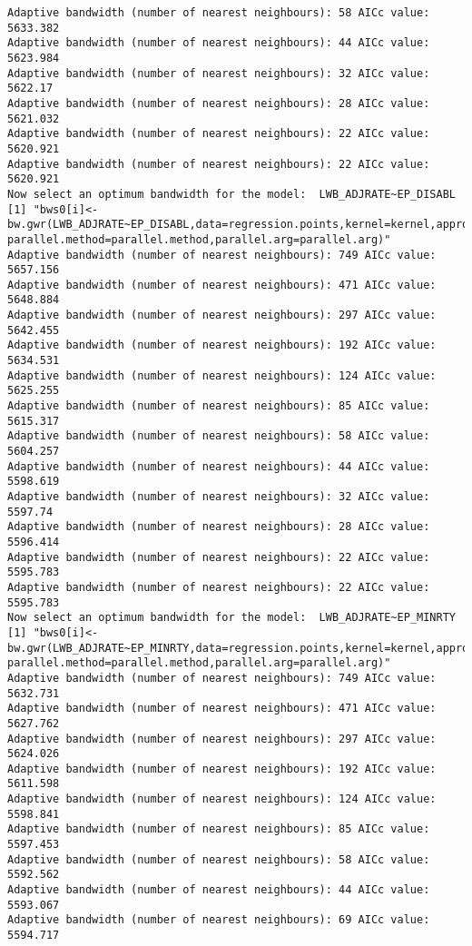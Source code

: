 \documentclass[
  12pt,
]{article}
\begin{document}
\begin{verbatim}
Adaptive bandwidth (number of nearest neighbours): 58 AICc value: 5633.382 
Adaptive bandwidth (number of nearest neighbours): 44 AICc value: 5623.984 
Adaptive bandwidth (number of nearest neighbours): 32 AICc value: 5622.17 
Adaptive bandwidth (number of nearest neighbours): 28 AICc value: 5621.032 
Adaptive bandwidth (number of nearest neighbours): 22 AICc value: 5620.921 
Adaptive bandwidth (number of nearest neighbours): 22 AICc value: 5620.921 
Now select an optimum bandwidth for the model:  LWB_ADJRATE~EP_DISABL 
[1] "bws0[i]<-bw.gwr(LWB_ADJRATE~EP_DISABL,data=regression.points,kernel=kernel,approach=approach,adaptive=adaptive,dMat=dMats[[var.dMat.indx[i]]], parallel.method=parallel.method,parallel.arg=parallel.arg)"
Adaptive bandwidth (number of nearest neighbours): 749 AICc value: 5657.156 
Adaptive bandwidth (number of nearest neighbours): 471 AICc value: 5648.884 
Adaptive bandwidth (number of nearest neighbours): 297 AICc value: 5642.455 
Adaptive bandwidth (number of nearest neighbours): 192 AICc value: 5634.531 
Adaptive bandwidth (number of nearest neighbours): 124 AICc value: 5625.255 
Adaptive bandwidth (number of nearest neighbours): 85 AICc value: 5615.317 
Adaptive bandwidth (number of nearest neighbours): 58 AICc value: 5604.257 
Adaptive bandwidth (number of nearest neighbours): 44 AICc value: 5598.619 
Adaptive bandwidth (number of nearest neighbours): 32 AICc value: 5597.74 
Adaptive bandwidth (number of nearest neighbours): 28 AICc value: 5596.414 
Adaptive bandwidth (number of nearest neighbours): 22 AICc value: 5595.783 
Adaptive bandwidth (number of nearest neighbours): 22 AICc value: 5595.783 
Now select an optimum bandwidth for the model:  LWB_ADJRATE~EP_MINRTY 
[1] "bws0[i]<-bw.gwr(LWB_ADJRATE~EP_MINRTY,data=regression.points,kernel=kernel,approach=approach,adaptive=adaptive,dMat=dMats[[var.dMat.indx[i]]], parallel.method=parallel.method,parallel.arg=parallel.arg)"
Adaptive bandwidth (number of nearest neighbours): 749 AICc value: 5632.731 
Adaptive bandwidth (number of nearest neighbours): 471 AICc value: 5627.762 
Adaptive bandwidth (number of nearest neighbours): 297 AICc value: 5624.026 
Adaptive bandwidth (number of nearest neighbours): 192 AICc value: 5611.598 
Adaptive bandwidth (number of nearest neighbours): 124 AICc value: 5598.841 
Adaptive bandwidth (number of nearest neighbours): 85 AICc value: 5597.453 
Adaptive bandwidth (number of nearest neighbours): 58 AICc value: 5592.562 
Adaptive bandwidth (number of nearest neighbours): 44 AICc value: 5593.067 
Adaptive bandwidth (number of nearest neighbours): 69 AICc value: 5594.717 

\end{verbatim}
\end{document}
